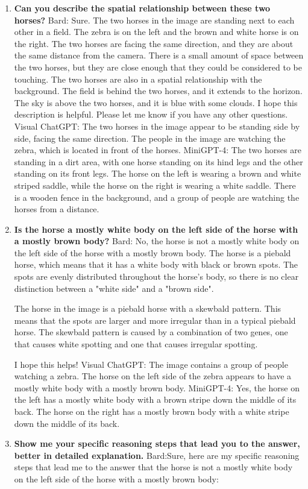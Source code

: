     \begin{enumerate}
        \item \textbf{Can you describe the spatial relationship between these two horses?}
        \subitem Bard: 
        Sure. The two horses in the image are standing next to each other in a field. The zebra is on the left and the brown and white horse is on the right. The two horses are facing the same direction, and they are about the same distance from the camera. There is a small amount of space between the two horses, but they are close enough that they could be considered to be touching.
        The two horses are also in a spatial relationship with the background. The field is behind the two horses, and it extends to the horizon. The sky is above the two horses, and it is blue with some clouds.
        I hope this description is helpful. Please let me know if you have any other questions.
        \subitem Visual ChatGPT: The two horses in the image appear to be standing side by side, facing the same direction. The people in the image are watching the zebra, which is located in front of the horses.
        \subitem MiniGPT-4: The two horses are standing in a dirt area, with one horse standing on its hind legs and the other standing on its front legs. The horse on the left is wearing a brown and white striped saddle, while the horse on the right is wearing a white saddle. There is a wooden fence in the background, and a group of people are watching the horses from a distance.
        \item \textbf{Is the horse a mostly white body on the left side of the horse with a mostly brown body?}
        \subitem Bard: 
        No, the horse is not a mostly white body on the left side of the horse with a mostly brown body. The horse is a piebald horse, which means that it has a white body with black or brown spots. The spots are evenly distributed throughout the horse's body, so there is no clear distinction between a "white side" and a "brown side".

        The horse in the image is a piebald horse with a skewbald pattern. This means that the spots are larger and more irregular than in a typical piebald horse. The skewbald pattern is caused by a combination of two genes, one that causes white spotting and one that causes irregular spotting.

        I hope this helps!
        \subitem Visual ChatGPT: The image contains a group of people watching a zebra. The horse on the left side of the zebra appears to have a mostly white body with a mostly brown body.
        \subitem MiniGPT-4: Yes, the horse on the left has a mostly white body with a brown stripe down the middle of its back. The horse on the right has a mostly brown body with a white stripe down the middle of its back.
        \item \textbf{Show me your specific reasoning steps that lead you to the answer, better in detailed explanation.}
        \subitem Bard:Sure, here are my specific reasoning steps that lead me to the answer that the horse is not a mostly white body on the left side of the horse with a mostly brown body:


\end{enumerate}
